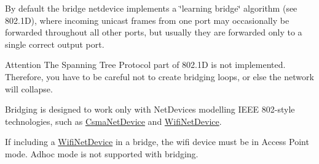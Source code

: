 By default the bridge netdevice implements a \char`\"{}learning bridge\char`\"{} algorithm (see 802.\+1D), where incoming unicast frames from one port may occasionally be forwarded throughout all other ports, but usually they are forwarded only to a single correct output port.

\begin{DoxyAttention}{Attention}
The Spanning Tree Protocol part of 802.\+1D is not implemented. Therefore, you have to be careful not to create bridging loops, or else the network will collapse.

Bridging is designed to work only with Net\+Devices modelling I\+E\+EE 802-\/style technologies, such as \hyperlink{classns3_1_1CsmaNetDevice}{Csma\+Net\+Device} and \hyperlink{classns3_1_1WifiNetDevice}{Wifi\+Net\+Device}.

If including a \hyperlink{classns3_1_1WifiNetDevice}{Wifi\+Net\+Device} in a bridge, the wifi device must be in Access Point mode. Adhoc mode is not supported with bridging. 
\end{DoxyAttention}
